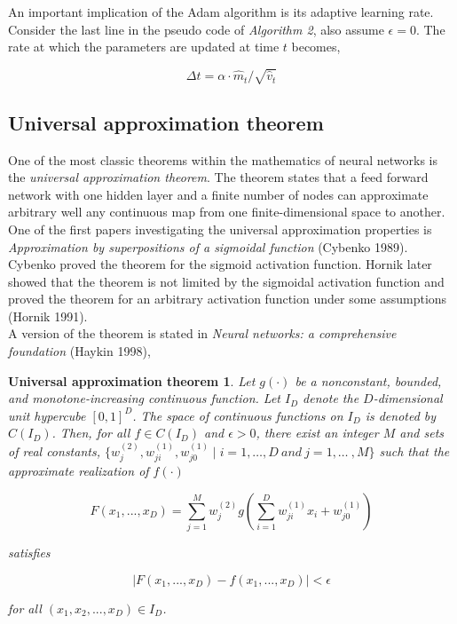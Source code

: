 \documentclass[11pt, letterpaper]{amsart}
\begin{document}
An important implication of the Adam algorithm is its adaptive learning rate. Consider the last line in the pseudo code of \textit{Algorithm 2}, also assume $\epsilon = 0$. The rate at which the parameters are updated at time $t$ becomes,

\begin{equation}
    \Delta t = \alpha \cdot \hat{m}_t / \sqrt{\hat{v}_t}
\end{equation}

\newpage

\subsection{Universal approximation theorem}
One of the most classic theorems within the mathematics of neural networks is the \textit{universal approximation theorem}. The theorem states that a feed forward network with one hidden layer and a finite number of nodes can approximate arbitrary well any continuous map from one finite-dimensional space to another. One of the first papers investigating the universal approximation properties is \textit{Approximation by superpositions of a sigmoidal function} (Cybenko 1989). Cybenko proved the theorem for the sigmoid activation function. Hornik later showed that the theorem is not limited by the sigmoidal activation function and proved the theorem for an arbitrary activation function under some assumptions (Hornik 1991).
\\

A version of the theorem is stated in \textit{Neural networks: a comprehensive foundation} (Haykin 1998),

\newtheorem*{mydef}{Universal approximation theorem}

\begin{mydef}
Let $g (\cdot)$ be a nonconstant, bounded, and monotone-increasing continuous function. Let $I_{D}$ denote the $D$-dimensional unit hypercube $[0,1]^{D}$. The space of continuous functions on $I_{D}$ is denoted by $C(I_{D})$. Then, for all $f \in C(I_{D})$ and $\epsilon > 0$, there exist an integer $M$ and sets of real constants, $\{w_j^{(2)}, w_{ji}^{(1)}, w_{j0}^{(1)} \mid i = 1,\ldots ,D \ \textit{and} \ j = 1, \ldots\ , M \}$ such that the approximate realization of $f(\cdot)$

\begin{equation}
    F(x_1, ..., x_{D}) = \sum_{j=1}^{M} w^{(2)}_{j} g \left( \sum_{i=1}^{D} w_{ji}^{(1)} x_i + w^{(1)}_{j0} \right)
\end{equation}

satisfies

\begin{equation}
    \vert F(x_1, ..., x_{D}) - f(x_1, ..., x_{D}) \vert < \epsilon
\end{equation}

for all $(x_1, x_2, ..., x_{D}) \in I_{D}$.

\end{mydef}
\end{document}
